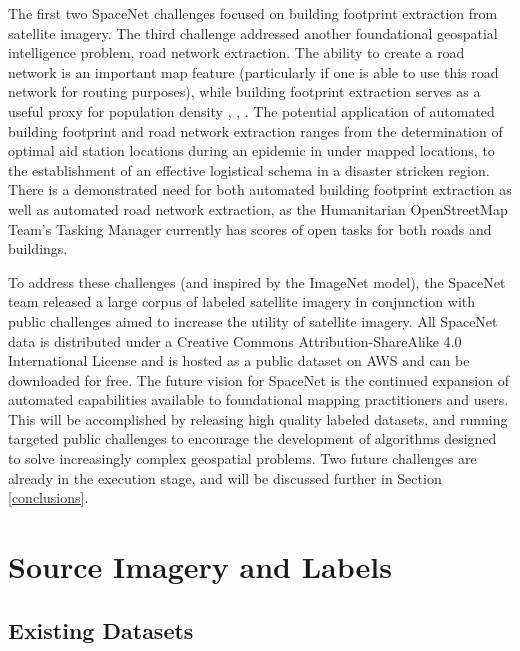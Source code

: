 \documentclass{article}
\begin{document}
The first two SpaceNet challenges focused on building footprint extraction from satellite imagery.  The third challenge addressed another foundational geospatial intelligence problem, road network extraction.  The ability to create a road network is an important map feature (particularly if one is able to use this road network for routing purposes), while building footprint extraction serves as a useful proxy for population density \cite{zhangpop}, \cite{popnature}, \cite{popplos1}. The potential application of automated building footprint and road network extraction ranges from the determination of optimal aid station locations during an epidemic in under mapped locations, to the establishment of an effective logistical schema in a disaster stricken region.    There is a demonstrated need for both automated building footprint extraction as well as automated road network extraction, as the Humanitarian OpenStreetMap Team's Tasking Manager \cite{hotosm}
currently has scores of open tasks for both roads and buildings. 

To address these challenges (and inspired by the ImageNet \cite{imagenet} model), the SpaceNet team released a large corpus of labeled satellite imagery in conjunction with public challenges aimed to increase the utility of satellite imagery.  
All SpaceNet data is distributed under a Creative Commons Attribution-ShareAlike 4.0 International License and is hosted as a public dataset on AWS and can be downloaded for free.
 The future vision for SpaceNet is the continued expansion of automated capabilities available to foundational mapping
practitioners and users.  This will be accomplished by releasing high quality labeled datasets, and running targeted public challenges to encourage the development of algorithms designed to solve increasingly complex geospatial problems. Two future challenges are already in the execution stage, and will be discussed further in Section \ref{conclusions}.
 




\section{Source Imagery and Labels}

\subsection{Existing Datasets}
\end{document}
